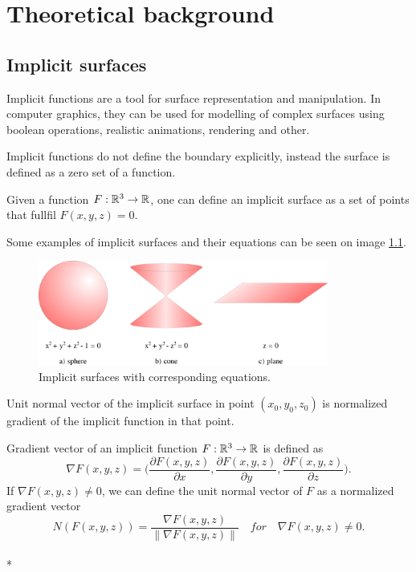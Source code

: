 \chapter{Theoretical background}
\label{chap2} %

\section{Implicit surfaces}
\label{sub2.1}

Implicit functions are a tool for surface representation and manipulation.
In computer graphics, they can be used for modelling of complex surfaces
using boolean operations, realistic animations, rendering and other.

Implicit functions do not define the boundary explicitly, instead
the surface is defined as a zero set of a function.
\begin{definition}
    Given a function $F: \mathbb{R}^3 \to \mathbb{R}$, one can define an implicit surface
    as a set of points that fullfil $F(x, y, z) = 0$.
\end{definition}

Some examples of implicit surfaces and their equations can be seen on
image \ref{img:1}.

\begin{figure}
    \centerline{\includegraphics[width=0.85\textwidth]{images/img1}}
    \caption[Implicit surfaces with corresponding equations]
    {Implicit surfaces with corresponding equations.}
    \label{img:1}
\end{figure}

Unit normal vector of the implicit surface in point $(x_0, y_0, z_0)$ is
normalized gradient of the implicit function in that point.

\begin{definition}
    Gradient vector of an implicit function $F:\mathbb{R}^3 \to \mathbb{R}$ is defined as 
    $$\nabla F(x, y, z) = \bigg(\frac{\partial F(x, y, z)}{\partial x}, \frac{\partial F(x, y, z)}{\partial y}, 
    \frac{\partial F(x, y, z)}{\partial z}\bigg).$$
    If $\nabla F(x,y,z) \neq 0$, we can define the unit normal vector of $F$ as 
    a normalized gradient vector
    $$N(F(x, y, z))  = \frac{\nabla F(x, y, z)}{\| \nabla F(x, y, z) \|} \,\,\,\,\,\, for \,\,\,\,\,\,
    \nabla F(x,y,z) \neq 0.$$
    \\*
\end{definition}

